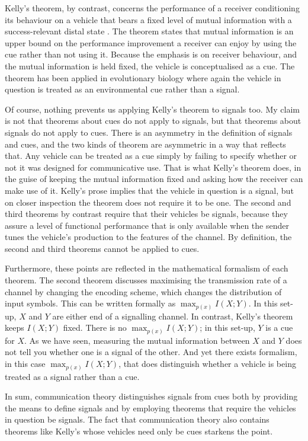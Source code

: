 Kelly's theorem, by contrast, concerns the performance of a receiver conditioning its behaviour on a vehicle that bears a fixed level of mutual information with a success-relevant distal state \citep{kelly1956new}.
The theorem states that mutual information is an upper bound on the performance improvement a receiver can enjoy by using the cue rather than not using it.
Because the emphasis is on receiver behaviour, and the mutual information is held fixed, the vehicle is conceptualised as a cue.
The theorem has been applied in evolutionary biology \citep{donaldson-matasci2010fitness} where again the vehicle in question is treated as an environmental cue rather than a signal.

Of course, nothing prevents us applying Kelly's theorem to signals too.
My claim is not that theorems about cues do not apply to signals, but that theorems about signals do not apply to cues.
There is an asymmetry in the definition of signals and cues, and the two kinds of theorem are asymmetric in a way that reflects that.
Any vehicle can be treated as a cue simply by failing to specify whether or not it was designed for communicative use.
That is what Kelly's theorem does, in the guise of keeping the mutual information fixed and asking how the receiver can make use of it.
Kelly's prose implies that the vehicle in question is a signal, but on closer inspection the theorem does not require it to be one.
The second and third theorems by contrast require that their vehicles be signals, because they assure a level of functional performance that is only available when the sender tunes the vehicle's production to the features of the channel.
By definition, the second and third theorems cannot be applied to cues.

Furthermore, these points are reflected in the mathematical formalism of each theorem.
The second theorem discusses maximising the transmission rate of a channel by changing the encoding scheme, which changes the distribution of input symbols.
This can be written formally as $\max_{p(x)}I(X;Y)$.
In this set-up, $X$ and $Y$ are either end of a signalling channel.
In contrast, Kelly's theorem keeps $I(X;Y)$ fixed.
There is no $\max_{p(x)}I(X;Y)$; in this set-up, $Y$ is a cue for $X$.
As we have seen, measuring the mutual information between $X$ and $Y$ does not tell you whether one is a signal of the other.
And yet there exists formalism, in this case $\max_{p(x)}I(X;Y)$, that does distinguish whether a vehicle is being treated as a signal rather than a cue.

In sum, communication theory distinguishes signals from cues both by providing the means to define signals and by employing theorems that require the vehicles in question be signals.
The fact that communication theory also contains theorems like Kelly's whose vehicles need only be cues starkens the point.

